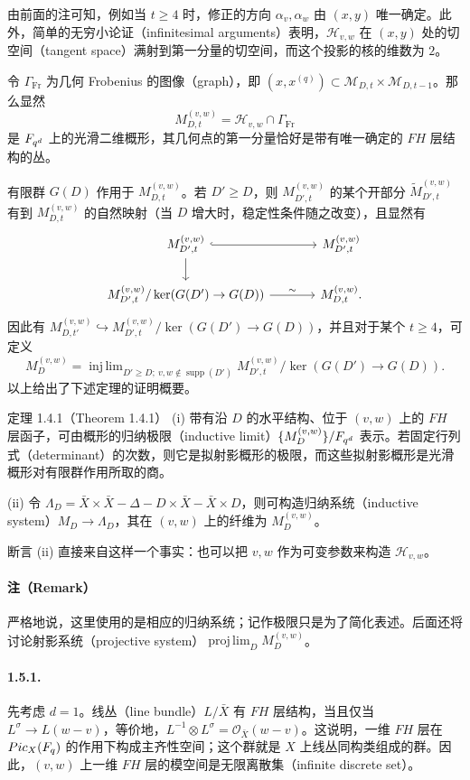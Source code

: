 由前面的注可知，例如当 $t\geq4$ 时，修正的方向 $\alpha_v,\alpha_w$ 由 $(x,y)$ 唯一确定。此外，简单的无穷小论证（infinitesimal arguments）表明，$\mathcal H_{v,w}$ 在 $(x,y)$ 处的切空间（tangent space）满射到第一分量的切空间，而这个投影的核的维数为 $2$。

令 $\Gamma_{\operatorname{Fr}}$ 为几何 Frobenius 的图像（graph），即
$(x,x^{(q)})\subset\mathcal M_{D,t}\times\mathcal M_{D,t-1}$。那么显然
\[
M_{D,t}^{(v,w)}=\mathcal H_{v,w}\cap\Gamma_{\operatorname{Fr}}
\]
是 $F_{q^d}$ 上的光滑二维概形，其几何点的第一分量恰好是带有唯一确定的 $FH$ 层结构的丛。

有限群 $G(D)$ 作用于 $M_{D,t}^{(v,w)}$。若 $D'\geq D$，则
$M_{D',t}^{(v,w)}$ 的某个开部分 $\widetilde M_{D',t}^{(v,w)}$ 有到 $M_{D,t}^{(v,w)}$ 的自然映射（当 $D$ 增大时，稳定性条件随之改变），且显然有
\[
\begin{tikzcd}[column sep=large]
\widetilde M_{D',t}^{(v,w)}\arrow[r,hook]\arrow[d]
&M_{D',t}^{(v,w)}\\
\widetilde M_{D',t}^{(v,w)}/\ker(G(D')\to G(D))\arrow[r,"\sim"]
&M_{D,t}^{(v,w)}.
\end{tikzcd}
\]
因此有 $M_{D,t'}^{(v,w)}\hookrightarrow M_{D',t}^{(v,w)}/\ker(G(D')\to G(D))$，并且对于某个 $t\geq4$，可定义
\[
M_D^{(v,w)}=\mathop{\operatorname{inj\,lim}}_{D'\geq D;\ v,w\notin\operatorname{supp}(D')}
M_{D',t}^{(v,w)}/\ker(G(D')\to G(D)).
\]
以上给出了下述定理的证明概要。
\begin{originaltheorem}{定理 1.4.1（Theorem 1.4.1）}
\textup{(i)} 带有沿 $D$ 的水平结构、位于 $(v,w)$ 上的 $FH$ 层函子，可由概形的归纳极限（inductive limit）$\{M_D^{(v,w)}\}/F_{q^d}$ 表示。若固定行列式（determinant）的次数，则它是拟射影概形的极限，而这些拟射影概形是光滑概形对有限群作用所取的商。

\textup{(ii)} 令
$\Lambda_D=\bar X\times\bar X-\Delta-D\times\bar X-\bar X\times D$，则可构造归纳系统（inductive system）$M_D\to\Lambda_D$，其在 $(v,w)$ 上的纤维为 $M_D^{(v,w)}$。
\end{originaltheorem}
断言 (ii) 直接来自这样一个事实：也可以把 $v,w$ 作为可变参数来构造 $\mathcal H_{v,w}$。
\paragraph*{注（Remark）}
严格地说，这里使用的是相应的归纳系统；记作极限只是为了简化表述。后面还将讨论射影系统（projective system）$\operatorname{proj\,lim}_D M_D^{(v,w)}$。
\paragraph*{1.5.1.}
先考虑 $d=1$。线丛（line bundle）$L/\bar X$ 有 $FH$ 层结构，当且仅当 $L^\sigma\to L(w-v)$，等价地，$L^{-1}\otimes L^\sigma=\mathcal O_{\bar X}(w-v)$。这说明，一维 $FH$ 层在 $Pic_X(F_q)$ 的作用下构成主齐性空间；这个群就是 $X$ 上线丛同构类组成的群。因此，$(v,w)$ 上一维 $FH$ 层的模空间是无限离散集（infinite discrete set）。

